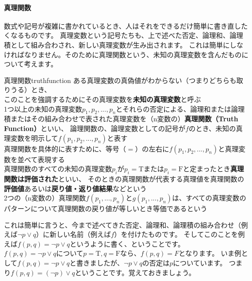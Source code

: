 \documentclass[report]{jlreq}%
\newcounter{myso}
\begin{document}
\pagebreak{}

\paragraph*{真理関数}
数式や記号が複雑に書かれているとき、人はそれをできるだけ簡単に書き直したくなるものです。
真理変数という記号たちも、上で述べた否定、論理和、論理積として組み合わされ、新しい真理変数が生み出されます。
これは簡単にしなければなりません。そのために真理関数という、未知の真理変数を含んだものについて考えます。

\begin{mysodef}{真理関数}{truthfunction}
	ある真理変数の真偽値がわからない（つまりどちらも取りうる）とき、\\
	このことを強調するためにその真理変数を\textbf{未知の真理変数}と呼ぶ\\
	1つ以上の未知の真理変数$p_1, p_2, ..., p_n$とそれらの否定による、論理和または論理積またはその組み合わせで表された真理変数を（n変数の）\textbf{真理関数（Truth Function）}といい、
	論理関数の、論理変数としての記号が$f$のとき、未知の真理変数を明示して$f(p_1, p_2, ..., p_n)$と表す\\
	真理関数を具体的に表すために、等号（$=$）の左右に$f(p_1, p_2, ..., p_n)$と真理変数を並べて表現する\\
	真理関数のすべての未知の真理変数$p_i$が$p_i=\mathrm{T}$または$p_i=\mathrm{F}$と定まったとき\textbf{真理関数は評価された}といい、
	そのときの真理関数が代表する真理値を真理関数の\textbf{評価値}あるいは\textbf{戻り値・返り値}\textbf{結果}などという\\
	2つの（n変数の）真理関数$f(p_1,...,p_n)$と$g(p_1,...,p_n)$は、すべての真理変数のパターンについて真理関数の戻り値が等しいとき等価であるという
\end{mysodef}
これは簡単に言うと、今まで述べてきた否定、論理和、論理積の組み合わせ（例えば$\neg{}p\lor{}q$）に新しい名前（例えば$f$）を付けたものです。
そしてこのことを例えば$f(p,q)=\neg{}p\lor{}q$というように書く、ということです。\\
$f(p,q)=\neg{}p\lor{}q$について$p=\mathrm{T},q=\mathrm{F}$なら、$f(p,q)=F$となります。
いま例として$f(p,q)=\neg{}p\lor{}q$と書きましたが、$\neg{}p\lor{}q$の否定は$p$についています。
つまり$f(p,q)=(\neg{}p)\lor{}q$ということです。覚えておきましょう。\\

\pagebreak
\end{document}
